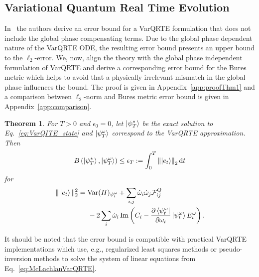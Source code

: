 \documentclass[twocolumn, aps, pra, superscriptaddress]{revtex4-1}
\newtheorem{theorem}{Theorem}
\DeclareMathOperator{\Var}{Var}
\DeclareMathOperator{\I}{Im}
\newcommand{\norm}[1]{\left\lVert#1\right\rVert}
\newcommand*{\di}{\mathrm{d}} %
\begin{document}
\subsection{Variational Quantum Real Time Evolution}
\label{subsec:error_qrte}
In~\cite{MartinazzoErrorVarQuantumDyn20} the authors derive an error bound for a VarQRTE formulation that does not include the global phase compensating terms. Due to the global phase dependent nature of the VarQRTE ODE, the resulting error bound presents an upper bound to the $\ell_2$-error.
We, now, align the theory with the global phase independent formulation of VarQRTE and derive a corresponding error bound for the Bures metric which helps to avoid that a physically irrelevant mismatch in the global phase influences the bound. The proof is given in Appendix~\ref{app:proofThm1} and a comparison between $\ell_2$-norm and Bures metric error bound is given in Appendix~\ref{app:comparison}.

\begin{theorem} \label{thm_VQRT}
For $T>0$ and $\epsilon_0=0$, let $\ket{\psi^*_T}$ be the exact solution to Eq.~\eqref{eq:VarQITE_state} and $\ket{\psi^{\omega}_T}$ correspond to the VarQRTE approximation. Then
\begin{align}
 B\left(\ket{\psi^*_T}, \ket{\psi^{\omega}_T}\right) \leq \epsilon_{T} := \int_{0}^{T} \norm{\ket{e_t}}_2 \di t
\end{align}
for 
\begin{align}
        \|\ket{e_t}\|^2_2 &= \Var(H)_{\psi^{\omega}_t} + \sum\limits_{i, j}\dot \omega_i \dot \omega_j \mathcal{F}^Q_{ij} \nonumber \\ 
    &\hspace{5mm}- 2\sum_i\dot\omega_i \I \left(C_i -  \frac{\partial \bra{\psi^{\omega}_t}}{\partial \omega_i}\ket{\psi^{\omega}_t}E_t^{\omega}\right) . \label{eq:varqrte_error_grad}
\end{align}
\end{theorem}
It should be noted that the error bound is compatible with practical VarQRTE implementations which use, e.g., regularized least squares methods or pseudo-inversion methods to solve the system of linear equations from Eq.~\eqref{eq:McLachlanVarQRTE}.

\end{document}
